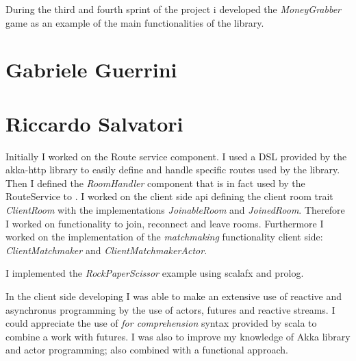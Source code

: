During the third and fourth sprint of the project i developed the \textit{MoneyGrabber} game as an example of the main functionalities of the library. 

\section{Gabriele Guerrini}

\section{Riccardo Salvatori}

Initially I worked on the Route service component. I used a DSL provided by the akka-http library to easily define and handle specific routes used by the library. Then I defined the \textit{RoomHandler} component that is in fact used by the RouteService to .
I worked on the client side api defining the client  room trait \textit{ClientRoom} with the implementations \textit{JoinableRoom} and \textit{JoinedRoom}. Therefore I worked on functionality to join, reconnect and leave rooms.
Furthermore I worked on the implementation of the \textit{matchmaking} functionality client side: \textit{ClientMatchmaker} and \textit{ClientMatchmakerActor}.

I implemented the \textit{RockPaperScissor} example using scalafx and prolog.

In the client side developing I was able to make an extensive use of reactive and asynchronus programming by the use of actors, futures and reactive streams. 
I could appreciate the use of \textit{for comprehension} syntax provided by scala to combine a work with futures. 
I was also  to improve my knowledge of  Akka library and actor programming; also combined with a functional approach.















